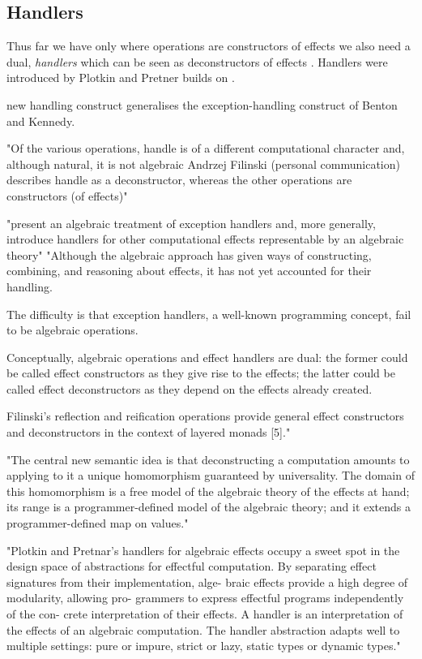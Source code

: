 \subsection{Handlers}
Thus far we have only
where operations are constructors of effects
we also need a dual,
\textit{handlers} which can be seen as deconstructors of effects
\cite{}.
Handlers were introduced by Plotkin and Pretner\cite{Plotkin:2009dr}
builds on
\cite{benton2001exceptional}.

new handling construct generalises the exception-handling construct of Benton and Kennedy. \cite{benton2001exceptional}

"Of the various operations, handle is of a different computational character and,
although natural, it is not algebraic
Andrzej Filinski (personal communication) describes handle as a deconstructor,
whereas the other operations are constructors (of effects)"
\cite{Plotkin:2002dw}

"present an algebraic treatment of exception handlers and,
more generally, introduce handlers for other computational effects
representable by an algebraic theory"
"Although the algebraic approach has given ways of constructing,
combining, and reasoning about effects, it has not yet accounted for their handling.


The difficulty is that exception handlers, a well-known programming concept,
fail to be algebraic operations.

Conceptually, algebraic operations and effect handlers are dual:
the former could be called effect constructors as they give rise to the effects;
the latter could be called effect deconstructors as they depend on the effects already created.

Filinski’s reflection and reification operations provide general effect constructors
and deconstructors in the context of layered monads [5]."

"The central new semantic idea is that deconstructing a computation amounts to
applying to it a unique homomorphism guaranteed by universality.
The domain of this homomorphism is a free model of the algebraic theory of the effects at hand;
its range is a programmer-defined model of the algebraic theory;
and it extends a programmer-defined map on values."
\cite{Plotkin:2009dr}


"Plotkin and Pretnar’s handlers for algebraic effects occupy a sweet spot in the design space of abstractions for effectful computation. By separating effect signatures from their implementation, alge- braic effects provide a high degree of modularity, allowing pro- grammers to express effectful programs independently of the con- crete interpretation of their effects. A handler is an interpretation of the effects of an algebraic computation. The handler abstraction adapts well to multiple settings: pure or impure, strict or lazy, static types or dynamic types."
\cite{kammar2013handlers}

